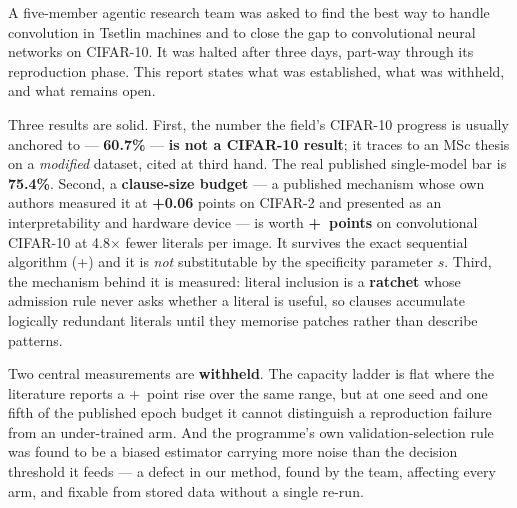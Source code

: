 A five-member agentic research team was asked to find the best way to handle convolution in Tsetlin
machines and to close the gap to convolutional neural networks on CIFAR-10. It was halted after three
days, part-way through its reproduction phase. This report states what was established, what was
withheld, and what remains open.

Three results are solid. First, the number the field's CIFAR-10 progress is usually anchored to ---
\textbf{60.7\%} --- \textbf{is not a CIFAR-10 result}; it traces to an MSc thesis on a \emph{modified}
dataset, cited at third hand. The real published single-model bar is \textbf{75.4\%}. Second, a
\textbf{clause-size budget} --- a published mechanism whose own authors measured it at \textbf{+0.06}
points on CIFAR-2 and presented as an interpretability and hardware device --- is worth
\textbf{+\BudDelta\ points} on convolutional CIFAR-10 at 4.8$\times$ fewer literals per image. It
survives the exact sequential algorithm (+\SeqDelta) and it is \emph{not} substitutable by the
specificity parameter $s$. Third, the mechanism behind it is measured: literal inclusion is a
\textbf{ratchet} whose admission rule never asks whether a literal is useful, so clauses accumulate
logically redundant literals until they memorise patches rather than describe patterns.

Two central measurements are \textbf{withheld}. The capacity ladder is flat where the literature
reports a +\LadderRisePub\ point rise over the same range, but at one seed and one fifth of the
published epoch budget it cannot distinguish a reproduction failure from an under-trained arm. And
the programme's own validation-selection rule was found to be a biased estimator carrying more noise
than the decision threshold it feeds --- a defect in our method, found by the team, affecting every
arm, and fixable from stored data without a single re-run.

